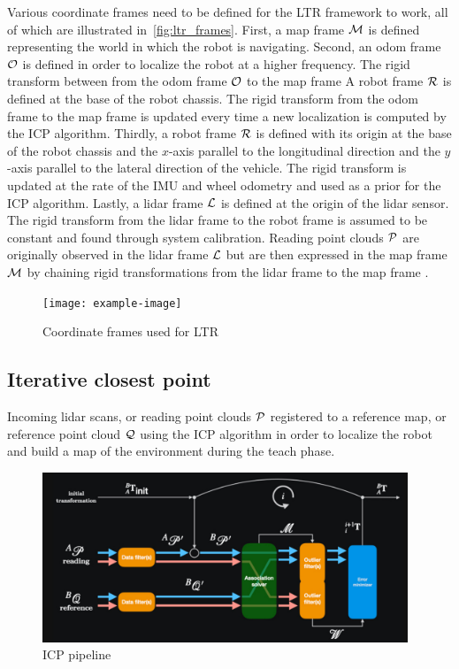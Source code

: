 Various coordinate frames need to be defined for the \ac{LTR} framework to work, all of which are illustrated in~\autoref{fig:ltr_frames}.
First, a map frame $\mathcal{M}$ is defined representing the world in which the robot is navigating.
Second, an odom frame $\mathcal{O}$ is defined in order to localize the robot at a higher frequency. %
The rigid transform between from the odom frame $\mathcal{O}$ to the map frame %
A robot frame $\mathcal{R}$ is defined at the base of the robot chassis. 
The rigid transform from the odom frame to the map frame \transform{\odomf}{\mapf} is updated every time a new localization is computed by the \ac{ICP} algorithm.
Thirdly, a robot frame $\mathcal{R}$ is defined with its origin at the base of the robot chassis and the $x$-axis parallel to the longitudinal direction and the $y$-axis parallel to the lateral direction of the vehicle.
The rigid transform \transform{\robotf}{\odomf} is updated at the rate of the \ac{IMU} and wheel odometry and used as a prior for the \ac{ICP} algorithm.
Lastly, a lidar frame $\mathcal{L}$ is defined at the origin of the lidar sensor. 
The rigid transform from the lidar frame to the robot frame \transform{\lidarf}{\robotf} is assumed to be constant and found through system calibration.
Reading point clouds $\mathcal{P}$ are originally observed in the lidar frame $\mathcal{L}$ but are then expressed in the map frame $\mathcal{M}$ by chaining rigid transformations from the lidar frame to the map frame \transform{\lidarf}{\mapf}.

\begin{figure} [htpb]
	\centering
	\texttt{[image: example-image]}
	\caption{Coordinate frames used for \ac{LTR}}
	\label{fig:ltr_frames}
\end{figure}

\subsection{Iterative closest point}
\label{ICP}

Incoming lidar scans, or reading point clouds $\mathcal{P}$ registered to a reference map, or reference point cloud $\mathcal{Q}$ using the \ac{ICP} algorithm in order to localize the robot and build a map of the environment during the teach phase.

\begin{figure} [htpb]
	\centering
	\includegraphics[height=2.0in]{figs/icp_pipeline.pdf}
	\caption{ICP pipeline}
	\label{fig:icp_pipeline}
\end{figure}

